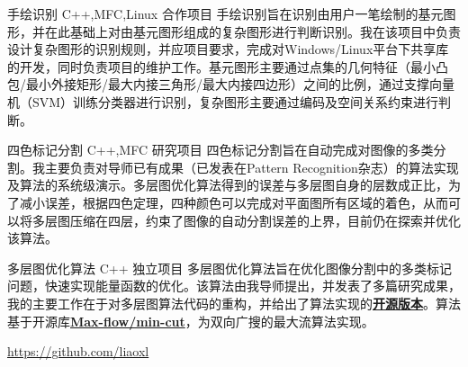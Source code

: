 \documentclass[11pt,a4paper,sans]{moderncv}   %
\begin{document}
\begin{CJK}{UTF8}{gbsn}
{手绘识别}
{C++,MFC,Linux}
{合作项目}{}
{手绘识别旨在识别由用户一笔绘制的基元图形，并在此基础上对由基元图形组成的复杂图形进行判断识别。我在该项目中负责设计复杂图形的识别规则，并应项目要求，完成对Windows/Linux平台下共享库的开发，同时负责项目的维护工作。基元图形主要通过点集的几何特征（最小凸包/最小外接矩形/最大内接三角形/最大内接四边形）之间的比例，通过支撑向量机（SVM）训练分类器进行识别，复杂图形主要通过编码及空间关系约束进行判断。}
\vspace*{0.2\baselineskip}

{四色标记分割}
{C++,MFC}
{研究项目}{}
{四色标记分割旨在自动完成对图像的多类分割。我主要负责对导师已有成果（已发表在Pattern Recognition杂志）的算法实现及算法的系统级演示。多层图优化算法得到的误差与多层图自身的层数成正比，为了减小误差，根据四色定理，四种颜色可以完成对平面图所有区域的着色，从而可以将多层图压缩在四层，约束了图像的自动分割误差的上界，目前仍在探索并优化该算法。}
\vspace*{0.2\baselineskip}

{多层图优化算法}
{C++}
{独立项目}{}
{多层图优化算法旨在优化图像分割中的多类标记问题，快速实现能量函数的优化。该算法由我导师提出，并发表了多篇研究成果，我的主要工作在于对多层图算法代码的重构，并给出了算法实现的\textbf{\href{https://github.com/liaoxl/MultiLayerGraph}{开源版本}}。算法基于开源库\textbf{\href{http://vision.csd.uwo.ca/code/}{Max-flow/min-cut}}，为双向广搜的最大流算法实现。}
\vspace*{0.2\baselineskip}

{\href{https://github.com/liaoxl}{https://github.com/liaoxl}}
{}{}{}{}


\renewcommand{\baselinestretch}{1.0}




\closesection{}                   %
\renewcommand{\listitemsymbol}{-} %
\clearpage\end{CJK}
\end{document}
